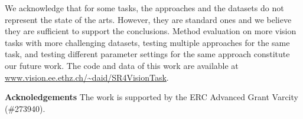 \documentclass[10pt,twocolumn,letterpaper]{article}
\begin{document}
We acknowledge that for some tasks, the approaches and the datasets do not represent the state of the arts.
However, they are standard ones and we believe they are sufficient to support the conclusions.   
Method evaluation on more vision tasks with more challenging datasets, 
testing multiple approaches for the same task, and testing
different parameter settings for the same approach constitute our future
work.  The code and data of this work are available at \url{www.vision.ee.ethz.ch/~daid/SR4VisionTask}.

\textbf{Acknoledgements} The work is supported by the ERC Advanced Grant Varcity (\#273940).

\small{


}
\end{document}
